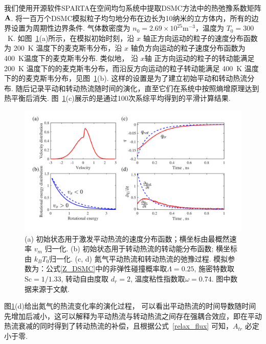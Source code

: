 我们使用开源软件SPARTA在空间均匀系统中提取DSMC方法中的热弛豫系数矩阵 $\bf{A}$. 将一百万个DSMC模拟粒子均匀地分布在边长为10纳米的立方体内，所有的边界设置为周期性边界条件. 气体数密度为 ${n_0=2.69\times10^{25}}$m$^{-3}$，温度为 $T_0=300$~K.  如图~\ref{fig:CalculateA}(a)所示，在模拟初始时刻，沿 $x$ 轴正方向运动的粒子的速度分布函数为 200~K 温度下的麦克斯韦分布，沿 $x$ 轴负方向运动的粒子速度分布函数为 400~K温度下的麦克斯韦分布. 类似地， 沿 $x$轴 正方向运动的粒子的转动能满足  200~K 温度下的的麦克斯韦分布，而沿反方向运动的粒子转动能满足 400~K 温度下的的麦克斯韦分布，见图~\ref{fig:CalculateA}(b). 这样的设置是为了建立初始平动和转动热流分布. 随后记录平动和转动热流随时间的演化，直至它们在系统中按照熵增原理达到热平衡后消失. 图~\ref{fig:CalculateA}(c)展示的是通过100次系综平均得到的平滑计算结果. 


\begin{figure}[t]
	\centering
	\includegraphics[scale=0.5,viewport=20 35 730 420,clip=true]{Fig/CalculateA.pdf}
	\caption{ (a) 初始状态用于激发平动热流的速度分布函数；横坐标由最概然速率 $v_m$ 归一化. (b) 初始状态用于转动热流的转动能分布函数; 横坐标由 $k_BT_0$归一化. (c, d) 氮气平动热流和转动热流的弛豫过程. 模拟参数为：公式\eqref{Z_DSMC}中的非弹性碰撞概率取$\Lambda=0.25$, 施密特数取$\text{Sc}=1/1.33$, 转动自由度取 $d_r=2$, 温度粘性指数取$\omega=0.74$. 图中数据来源于文献\cite{Li2021Uncertainty}.
	}
	\label{fig:CalculateA}
\end{figure}

图\ref{fig:CalculateA}(d)给出氮气的热流变化率的演化过程， 可以看出平动热流的时间导数随时间先增加后减小，这可以解释为平动热流与转动热流之间存在强耦合效应，即在平动热流衰减的同时得到了转动热流的补偿，且根据公式~\eqref{relax_flux} 可知，$A_{tr}$ 必定小于零. 



